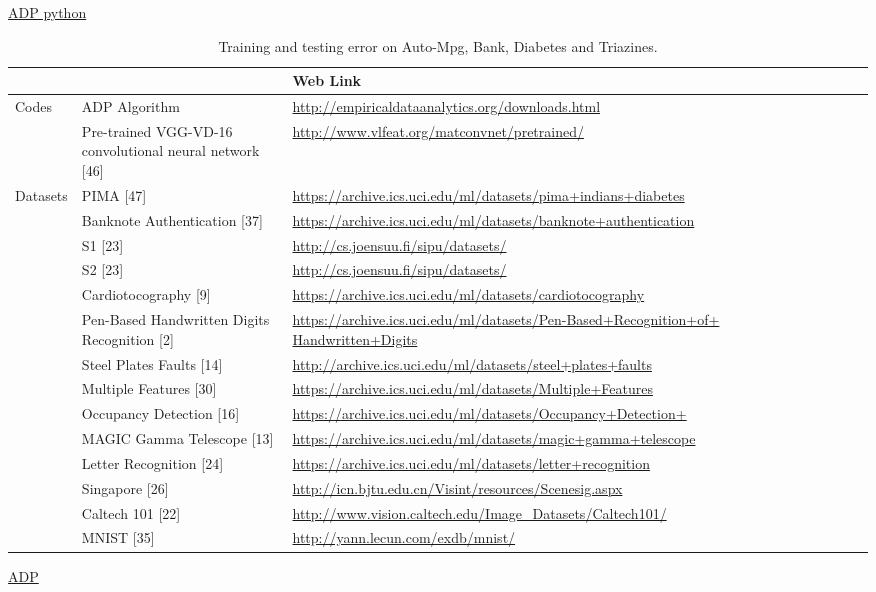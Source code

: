 \href{https://github.com/Gu-X/Autonomous-Data-Partitioning-Algorithm}{ADP python}
\begin{sidewaystable}[!ht]
\caption{Training and testing error on Auto-Mpg, Bank, Diabetes and Triazines.}
\begin{center}
 \begin{tabular}{lp{10cm}lcccccccc}
\toprule
 &  &  Web Link  \\
\toprule
Codes &ADP Algorithm &\small{\url{http://empiricaldataanalytics.org/downloads.html}}\\
&Pre-trained VGG-VD-16 convolutional neural network [46]&\small{\url{http://www.vlfeat.org/matconvnet/pretrained/}}\\
Datasets &PIMA [47] &\small{\url{https://archive.ics.uci.edu/ml/datasets/pima+indians+diabetes}}\\
&Banknote Authentication [37] &\small{\url{https://archive.ics.uci.edu/ml/datasets/banknote+authentication}}\\
&S1 [23] &\small{\url{http://cs.joensuu.fi/sipu/datasets/}}\\
&S2 [23] &\small{\url{http://cs.joensuu.fi/sipu/datasets/}}\\
&Cardiotocography [9] &\small{\url{https://archive.ics.uci.edu/ml/datasets/cardiotocography}}\\
&Pen-Based Handwritten Digits Recognition [2] &\small{\url{https://archive.ics.uci.edu/ml/datasets/Pen-Based+Recognition+of+
Handwritten+Digits}}\\
&Steel Plates Faults [14] &\small{\url{http://archive.ics.uci.edu/ml/datasets/steel+plates+faults}}\\
&Multiple Features [30] &\small{\url{https://archive.ics.uci.edu/ml/datasets/Multiple+Features}}\\
&Occupancy Detection [16] &\small{\url{https://archive.ics.uci.edu/ml/datasets/Occupancy+Detection+}}\\
&MAGIC Gamma Telescope [13] &\small{\url{https://archive.ics.uci.edu/ml/datasets/magic+gamma+telescope}}\\
&Letter Recognition [24] &\small{\url{https://archive.ics.uci.edu/ml/datasets/letter+recognition}}\\
&Singapore [26] &\small{\url{http://icn.bjtu.edu.cn/Visint/resources/Scenesig.aspx}}\\
&Caltech 101 [22] &\small{\url{http://www.vision.caltech.edu/Image_Datasets/Caltech101/}}\\
&MNIST [35] &\small{\url{http://yann.lecun.com/exdb/mnist/}}\\
\bottomrule
\end{tabular}
\end{center}
\label{TT2-ELM170610:Sec5-3-1}
\end{sidewaystable}
\href{https://ww2.mathworks.cn/matlabcentral/fileexchange/67463-autonomous-data-partitioning-algorithm?s_tid=prof_contriblnk}{ADP}


